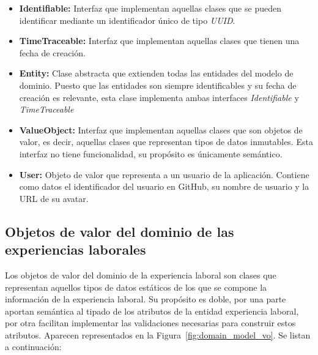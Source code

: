 \documentclass[a4paper, 12pt]{book}
\begin{document}
    \begin{itemize}
        \item \textbf{Identifiable:} Interfaz que implementan aquellas clases que se pueden identificar mediante un identificador único de tipo \emph{UUID}.
        \item \textbf{TimeTraceable:} Interfaz que implementan aquellas clases que tienen una fecha de creación.
        \item\textbf{Entity:} Clase abstracta que extienden todas las entidades del modelo de dominio. Puesto que las entidades son siempre identificables y su fecha de creación es relevante, esta clase implementa ambas interfaces \emph{Identifiable} y \emph{TimeTraceable}
        \item \textbf{ValueObject:} Interfaz que implementan aquellas clases que son objetos de valor, es decir, aquellas clases que representan tipos de datos inmutables. Esta interfaz no tiene funcionalidad, su propósito es únicamente semántico.
        \item \textbf{User:} Objeto de valor que representa a un usuario de la aplicación. Contiene como datos el identificador del usuario en GitHub, su nombre de usuario y la URL de su avatar.
    \end{itemize}

    \subsection{Objetos de valor del dominio de las experiencias laborales}
    \label{subsec:work_experience_value_objects}
    Los objetos de valor del dominio de la experiencia laboral son clases que representan aquellos tipos de datos estáticos de los que se compone la información de la experiencia laboral.
    Su propósito es doble, por una parte aportan semántica al tipado de los atributos de la entidad experiencia laboral, por otra facilitan implementar las validaciones necesarias para construir estos atributos.
    Aparecen representados en la Figura~\ref{fig:domain_model_vo}.
    Se listan a continuación:
\end{document}
